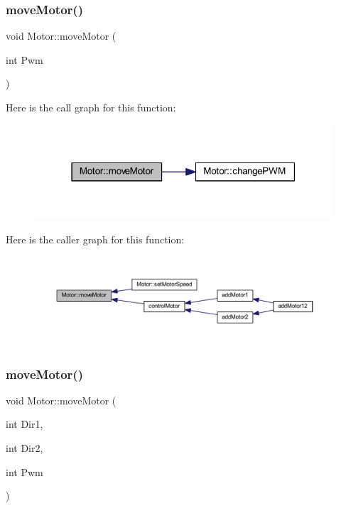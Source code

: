 \subsubsection{\texorpdfstring{move\+Motor()}{moveMotor()}\hspace{0.1cm}{\footnotesize\ttfamily [1/2]}}
{\footnotesize\ttfamily void Motor\+::move\+Motor (\begin{DoxyParamCaption}\item[{int}]{Pwm }\end{DoxyParamCaption})}

Here is the call graph for this function\+:\nopagebreak
\begin{figure}[H]
\begin{center}
\leavevmode
\includegraphics[width=315pt]{class_motor_a81fada8275a8cd70805a9808314e7bee_cgraph}
\end{center}
\end{figure}
Here is the caller graph for this function\+:\nopagebreak
\begin{figure}[H]
\begin{center}
\leavevmode
\includegraphics[width=350pt]{class_motor_a81fada8275a8cd70805a9808314e7bee_icgraph}
\end{center}
\end{figure}
\mbox{\label{class_motor_a06b855952ba7034f260063b6d94c4b3a}} 
\subsubsection{\texorpdfstring{move\+Motor()}{moveMotor()}\hspace{0.1cm}{\footnotesize\ttfamily [2/2]}}
{\footnotesize\ttfamily void Motor\+::move\+Motor (\begin{DoxyParamCaption}\item[{int}]{Dir1,  }\item[{int}]{Dir2,  }\item[{int}]{Pwm }\end{DoxyParamCaption})}

